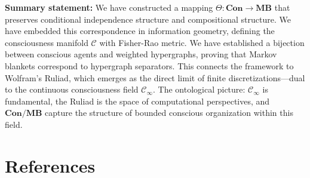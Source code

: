 \documentclass[11pt,a4paper]{article}
\theoremstyle{definition}
\theoremstyle{plain}
\theoremstyle{remark}
\newcommand{\Con}{\mathbf{Con}}
\newcommand{\MB}{\mathbf{MB}}
\begin{document}
\vspace{1em}

\textbf{Summary statement:} We have constructed a mapping $\Theta: \Con \to \MB$ that preserves conditional independence structure and compositional structure. We have embedded this correspondence in information geometry, defining the consciousness manifold $\mathcal{C}$ with Fisher-Rao metric. We have established a bijection between conscious agents and weighted hypergraphs, proving that Markov blankets correspond to hypergraph separators. This connects the framework to Wolfram's Ruliad, which emerges as the direct limit of finite discretizations---dual to the continuous consciousness field $\mathcal{C}_\infty$. The ontological picture: $\mathcal{C}_\infty$ is fundamental, the Ruliad is the space of computational perspectives, and $\Con/\MB$ capture the structure of bounded conscious organization within this field.

\section*{References}
\end{document}
